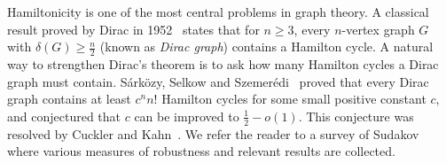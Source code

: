 \documentclass[11pt, a4paper]{article}
\theoremstyle{definition}
\newcommand{\<}{\subseteq}
\begin{document}
Hamiltonicity is one of the
most central problems in graph theory. A classical result proved by Dirac in 1952~\cite{Dirac} states that for $n\geq 3$, every $n$-vertex graph $G$ with $\delta(G) \ge \frac{n}{2}$ (known as \textit{Dirac graph}) contains a Hamilton cycle.  
A natural way to strengthen Dirac’s theorem is to ask how many Hamilton cycles a Dirac graph must contain. S\'{a}rk\"{o}zy, Selkow and Szemer\'{e}di~\cite{Sarkozy2003} proved that every Dirac graph contains at least $c^nn!$ Hamilton cycles for some small positive constant $c$, and conjectured that $c$ can be improved to $\frac{1}{2}-o(1)$. This conjecture was resolved by Cuckler and Kahn~\cite{Cuckler2009}. 
{We refer the reader to a survey of Sudakov~\cite{Sudakov2017} where various measures of robustness and relevant results are collected.}
\end{document}
